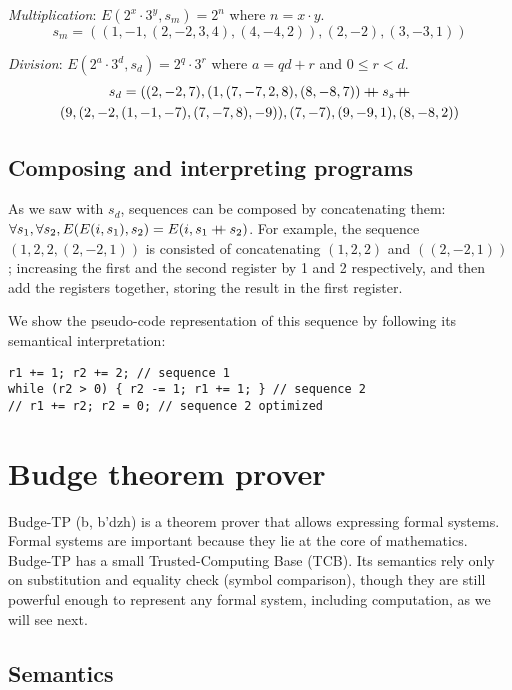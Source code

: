 \documentclass{article}
\newcommand\doubleplus{\mathbin{{+}\mspace{-8mu}{+}}}
\begin{document}
\textit{Multiplication}: $E(2^x \cdot 3^y, s_m) = 2^n$ where $n = x \cdot y$.
$$s_m = ((1, -1, (2, -2, 3, 4), (4, -4, 2)), (2, -2), (3, -3, 1))$$

\textit{Division}: $E(2^a \cdot 3^d, s_d) = 2^q \cdot 3^r$ where $a = qd + r$ and $0 \leq r < d$.
\begin{gather*}
s_d = ((2, -2, 7), (1, (7, -7, 2, 8), (8, -8, 7)) \doubleplus s_s \doubleplus \\ (9, (2, -2, (1, -1, -7), (7, -7, 8), -9)), (7, -7), (9, -9, 1), (8, -8, 2))
\end{gather*}

\subsection{Composing and interpreting programs}

As we saw with $s_d$, sequences can be composed by concatenating them: $\forall s_1, \forall s_2, E(E(i, s_1), s_2) = E(i, s_1 \doubleplus s_2)$. For example, the sequence $(1, 2, 2, (2, -2, 1))$ is consisted of concatenating $(1, 2, 2)$ and $((2, -2, 1))$; increasing the first and the second register by 1 and 2 respectively, and then add the registers together, storing the result in the first register.

We show the pseudo-code representation of this sequence by following its semantical interpretation:

\begin{verbatim}
r1 += 1; r2 += 2; // sequence 1
while (r2 > 0) { r2 -= 1; r1 += 1; } // sequence 2
// r1 += r2; r2 = 0; // sequence 2 optimized
\end{verbatim}

\section{Budge theorem prover}

Budge-TP (b\textturnv\textdyoghlig, b'dzh) is a theorem prover that allows expressing formal systems. Formal systems are important because they lie at the core of mathematics. Budge-TP has a small Trusted-Computing Base (TCB). Its semantics rely only on substitution and equality check (symbol comparison), though they are still powerful enough to represent any formal system, including computation, as we will see next.

\subsection{Semantics}
\end{document}
